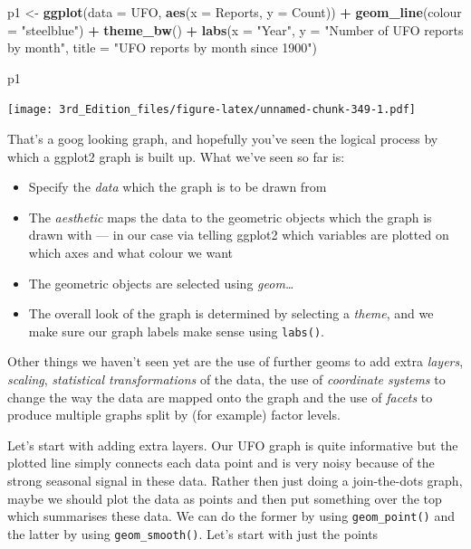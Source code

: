 \documentclass[
]{book}
\newenvironment{Shaded}{\begin{snugshade}}{\end{snugshade}}
\newcommand{\DataTypeTok}[1]{\textcolor[rgb]{0.13,0.29,0.53}{#1}}
\newcommand{\KeywordTok}[1]{\textcolor[rgb]{0.13,0.29,0.53}{\textbf{#1}}}
\newcommand{\NormalTok}[1]{#1}
\newcommand{\OperatorTok}[1]{\textcolor[rgb]{0.81,0.36,0.00}{\textbf{#1}}}
\newcommand{\StringTok}[1]{\textcolor[rgb]{0.31,0.60,0.02}{#1}}
\providecommand{\tightlist}{%
  \setlength{\itemsep}{0pt}\setlength{\parskip}{0pt}}
\begin{document}
\begin{Shaded}
\begin{Highlighting}[]
\NormalTok{p1 <-}\StringTok{ }\KeywordTok{ggplot}\NormalTok{(}\DataTypeTok{data =}\NormalTok{ UFO, }\KeywordTok{aes}\NormalTok{(}\DataTypeTok{x =}\NormalTok{ Reports, }
                             \DataTypeTok{y =}\NormalTok{ Count)) }\OperatorTok{+}
\StringTok{               }\KeywordTok{geom_line}\NormalTok{(}\DataTypeTok{colour =} \StringTok{"steelblue"}\NormalTok{) }\OperatorTok{+}
\StringTok{               }\KeywordTok{theme_bw}\NormalTok{() }\OperatorTok{+}
\StringTok{               }\KeywordTok{labs}\NormalTok{(}\DataTypeTok{x =} \StringTok{"Year"}\NormalTok{, }
                    \DataTypeTok{y =} \StringTok{"Number of UFO reports by month"}\NormalTok{, }
                    \DataTypeTok{title =} \StringTok{"UFO reports by month since 1900"}\NormalTok{)}

\NormalTok{p1}
\end{Highlighting}
\end{Shaded}

\texttt{[image: 3rd\_Edition\_files/figure-latex/unnamed-chunk-349-1.pdf]}

That's a goog looking graph, and hopefully you've seen the logical process by which a ggplot2 graph is built up. What we've seen so far is:

\begin{itemize}
\tightlist
\item
  Specify the \emph{data} which the graph is to be drawn from
\item
  The \emph{aesthetic} maps the data to the geometric objects which the graph is drawn with --- in our case via telling ggplot2 which variables are plotted on which axes and what colour we want
\item
  The geometric objects are selected using \emph{geom\ldots{}}
\item
  The overall look of the graph is determined by selecting a \emph{theme}, and we make sure our graph labels make sense using \texttt{labs()}.
\end{itemize}

Other things we haven't seen yet are the use of further geoms to add extra \emph{layers}, \emph{scaling}, \emph{statistical transformations} of the data, the use of \emph{coordinate systems} to change the way the data are mapped onto the graph and the use of \emph{facets} to produce multiple graphs split by (for example) factor levels.

Let's start with adding extra layers. Our UFO graph is quite informative but the plotted line simply connects each data point and is very noisy because of the strong seasonal signal in these data. Rather then just doing a join-the-dots graph, maybe we should plot the data as points and then put something over the top which summarises these data. We can do the former by using \texttt{geom\_point()} and the latter by using \texttt{geom\_smooth()}. Let's start with just the points
\end{document}
